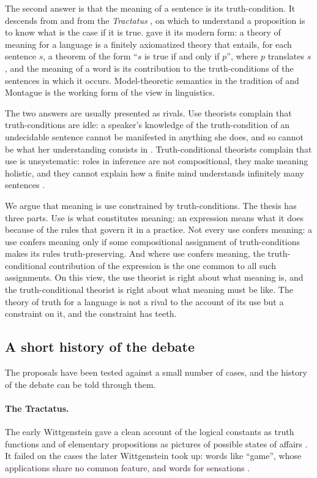 \documentclass{situationist-preprint}
\begin{document}
The second answer is that the meaning of a sentence is its truth-condition. It descends from \citet{Frege1892} and from the \emph{Tractatus} \citep[4.024]{Wittgenstein1922}, on which to understand a proposition is to know what is the case if it is true. \citet{Davidson1967} gave it its modern form: a theory of meaning for a language is a finitely axiomatized theory that entails, for each sentence $s$, a theorem of the form \enquote{$s$ is true if and only if $p$}, where $p$ translates $s$, and the meaning of a word is its contribution to the truth-conditions of the sentences in which it occurs. Model-theoretic semantics in the tradition of \citet{Lewis1970gs} and Montague is the working form of the view in linguistics.

The two answers are usually presented as rivals. Use theorists complain that truth-conditions are idle: a speaker's knowledge of the truth-condition of an undecidable sentence cannot be manifested in anything she does, and so cannot be what her understanding consists in \citep{Dummett1975}. Truth-conditional theorists complain that use is unsystematic: roles in inference are not compositional, they make meaning holistic, and they cannot explain how a finite mind understands infinitely many sentences \citep{FodorLepore1991,FodorLepore1992}.

We argue that meaning is use constrained by truth-conditions. The thesis has three parts. Use is what constitutes meaning: an expression means what it does because of the rules that govern it in a practice. Not every use confers meaning: a use confers meaning only if some compositional assignment of truth-conditions makes its rules truth-preserving. And where use confers meaning, the truth-conditional contribution of the expression is the one common to all such assignments. On this view, the use theorist is right about what meaning is, and the truth-conditional theorist is right about what meaning must be like. The theory of truth for a language is not a rival to the account of its use but a constraint on it, and the constraint has teeth.

\subsection{A short history of the debate}

The proposals have been tested against a small number of cases, and the history of the debate can be told through them.

\paragraph{The Tractatus.} The early Wittgenstein gave a clean account of the logical constants as truth functions and of elementary propositions as pictures of possible states of affairs \citep[4.0312]{Wittgenstein1922}. It failed on the cases the later Wittgenstein took up: words like \enquote{game}, whose applications share no common feature, and words for sensations \citep[\S\S66--67, 258]{Wittgenstein1953}.
\end{document}
